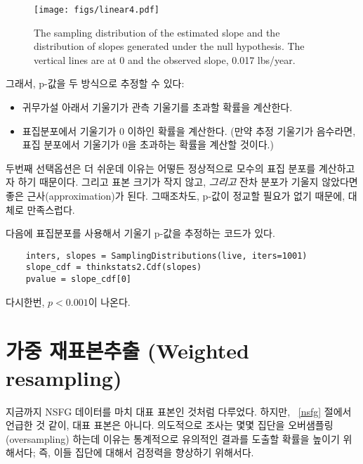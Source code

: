
\begin{figure}
\centerline{\texttt{[image: figs/linear4.pdf]}}
\caption{The sampling distribution of the estimated
slope and the distribution of slopes
generated under the null hypothesis.  The vertical lines are at 0
and the observed slope, 0.017 lbs/year.}
\label{linear4}
\end{figure}

그래서, p-값을 두 방식으로 추정할 수 있다:

\begin{itemize}

\item 귀무가설 아래서 기울기가 관측 기울기를 초과할 확률을 계산한다.

\item 표집분포에서 기울기가 0 이하인 확률을 계산한다. (만약 추정 기울기가 음수라면, 표집 분포에서 기울기가 0을 초과하는 확률을 계산할 것이다.)

\end{itemize}

두번째 선택옵션은 더 쉬운데 이유는 어떻든 정상적으로 모수의 표집 분포를 계산하고자 하기 때문이다. 그리고 표본 크기가 작지 않고, {\em 그리고} 잔차 분포가 기울지 않았다면 좋은 근사(approximation)가 된다. 그때조차도, p-값이 정교할 필요가 없기 때문에, 대체로 만족스럽다.


다음에 표집분포를 사용해서 기울기 p-값을 추정하는 코드가 있다.

\begin{verbatim}
    inters, slopes = SamplingDistributions(live, iters=1001)
    slope_cdf = thinkstats2.Cdf(slopes)
    pvalue = slope_cdf[0]
\end{verbatim}

다시한번, $p < 0.001$이 나온다.  


\section{가중 재표본추출 (Weighted resampling)}
\label{weighted}

지금까지 NSFG 데이터를 마치 대표 표본인 것처럼 다루었다. 하지만, ~\ref{nsfg} 절에서 언급한 것 같이, 대표 표본은 아니다. 의도적으로 조사는 몇몇 집단을 오버샘플링(oversampling) 하는데 이유는 통계적으로 유의적인 결과를 도출할 확률을 높이기 위해서다; 즉, 이들 집단에 대해서 검정력을 향상하기 위해서다.

